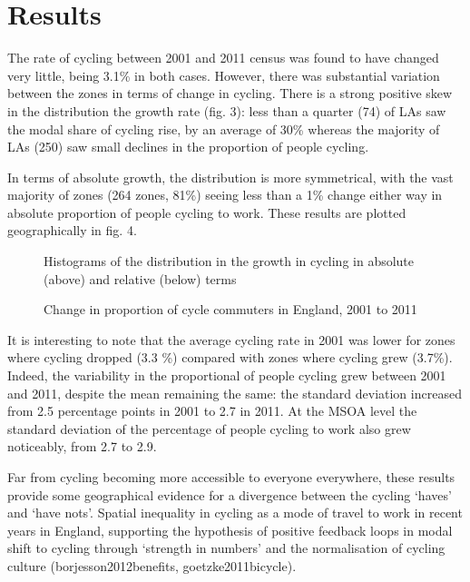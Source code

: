 \section{Results}\label{results}

The rate of cycling between 2001 and 2011 census was found to have
changed very little, being 3.1\% in both cases. However, there was
substantial variation between the zones in terms of change in cycling.
There is a strong positive skew in the distribution the growth rate
(fig. 3): less than a quarter (74) of LAs saw the modal share of cycling
rise, by an average of 30\% whereas the majority of LAs (250) saw small
declines in the proportion of people cycling.

In terms of absolute growth, the distribution is more symmetrical, with
the vast majority of zones (264 zones, 81\%) seeing less than a 1\%
change either way in absolute proportion of people cycling to work.
These results are plotted geographically in fig. 4.

\begin{figure}[htbp]
\centering
\caption{Histograms of the distribution in the growth in cycling in
absolute (above) and relative (below) terms}
\end{figure}

\begin{figure}[htbp]
\centering
\caption{Change in proportion of cycle commuters in England, 2001 to
2011}
\end{figure}

It is interesting to note that the average cycling rate in 2001 was
lower for zones where cycling dropped (3.3 \%) compared with zones where
cycling grew (3.7\%). Indeed, the variability in the proportional of
people cycling grew between 2001 and 2011, despite the mean remaining
the same: the standard deviation increased from 2.5 percentage points in
2001 to 2.7 in 2011. At the MSOA level the standard deviation of the
percentage of people cycling to work also grew noticeably, from 2.7 to
2.9.

Far from cycling becoming more accessible to everyone everywhere, these
results provide some geographical evidence for a divergence between the
cycling `haves' and `have nots'. Spatial inequality in cycling as a mode
of travel to work in recent years in England, supporting the hypothesis
of positive feedback loops in modal shift to cycling through `strength
in numbers' and the normalisation of cycling culture
(borjesson2012benefits, goetzke2011bicycle).


